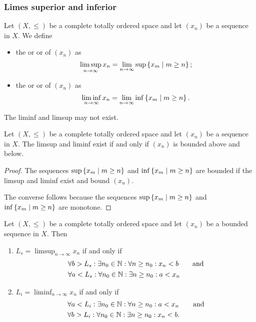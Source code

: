 \subsubsection{Limes superior and inferior}
\begin{definition}
Let $(X,\leq)$ be a complete totally ordered space and let $(x_n)$ be a sequence in $X$. We define
\begin{itemize}
\item the  or  or  of $(x_n)$ as
\[ \limsup_{n\to\infty} x_n = \lim_{n\to \infty} \sup\left\{ x_m \;\middle|\; m\geq n \right\}; \]
\item the  or  or  of $(x_n)$ as
\[ \liminf_{n\to\infty} x_n = \lim_{n\to \infty} \inf\left\{ x_m \;\middle|\; m\geq n \right\}. \]
\end{itemize}
\end{definition}
The liminf and limsup may not exist.
\begin{lemma}
Let $(X,\leq)$ be a complete totally ordered space and let $(x_n)$ be a sequence in $X$. The limsup and liminf exist \textup{if and only if}  $(x_n)$ is bounded above and below.
\end{lemma}
\begin{proof}
The sequences $\sup\left\{ x_m \;\middle|\; m\geq n \right\}$ and $\inf\left\{ x_m \;\middle|\; m\geq n \right\}$ are bounded if the limsup and liminf exist and bound $(x_n)$.

The converse follows because the sequences $\sup\left\{ x_m \;\middle|\; m\geq n \right\}$ and $\inf\left\{ x_m \;\middle|\; m\geq n \right\}$ are monotone.
\end{proof}

\begin{proposition} \label{characterisationLimsupLiminf}
Let $(X,\leq)$ be a complete totally ordered space and let $(x_n)$ be a bounded sequence in $X$. Then 
\begin{enumerate}
\item $L_s = \limsup_{n\to\infty} x_n$ \textup{if and only if}
\begin{align*}
&\forall b > L_s: \exists n_0\in \mathbb{N}:\forall n\geq n_0: x_n < b \qquad \text{and} \\
&\forall a < L_s: \forall n_0\in \mathbb{N}:\exists n\geq n_0: a < x_n
\end{align*}
\item $L_i = \liminf_{n\to\infty} x_n$ \textup{if and only if}
\begin{align*}
&\forall a < L_i: \exists n_0\in \mathbb{N}:\forall n\geq n_0: a < x_n \qquad \text{and} \\
&\forall b > L_i: \forall n_0\in \mathbb{N}:\exists n\geq n_0: x_n < b.
\end{align*}
\end{enumerate}
\end{proposition}

